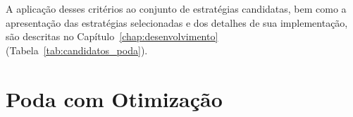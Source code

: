 A aplicação desses critérios ao conjunto de estratégias candidatas, bem como a apresentação
das estratégias selecionadas e dos detalhes de sua implementação, são descritas no
Capítulo~\ref{chap:desenvolvimento} (Tabela~\ref{tab:candidatos_poda}).

\section{Poda com Otimização}\label{sec:metodologia_poda_com}


